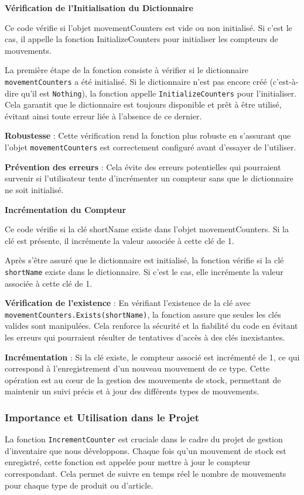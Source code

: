 \documentclass[a4paper, oneside, 12pt, final]{extreport}
\begin{document}
\textbf{Vérification de l'Initialisation du Dictionnaire}

Ce code vérifie si l'objet movementCounters est vide ou non initialisé. Si c'est le cas, il appelle la fonction InitializeCounters pour initialiser les compteurs de mouvements.

La première étape de la fonction consiste à vérifier si le dictionnaire \texttt{movementCounters} a été initialisé. Si le dictionnaire n'est pas encore créé (c'est-à-dire qu'il est \texttt{Nothing}), la fonction appelle \texttt{InitializeCounters} pour l'initialiser. Cela garantit que le dictionnaire est toujours disponible et prêt à être utilisé, évitant ainsi toute erreur liée à l'absence de ce dernier.

\textbf{Robustesse} : Cette vérification rend la fonction plus robuste en s'assurant que l'objet \texttt{movementCounters} est correctement configuré avant d'essayer de l'utiliser.

\textbf{Prévention des erreurs} : Cela évite des erreurs potentielles qui pourraient survenir si l'utilisateur tente d'incrémenter un compteur sans que le dictionnaire ne soit initialisé.



\textbf{Incrémentation du Compteur}


Ce code vérifie si la clé shortName existe dans l'objet movementCounters. Si la clé est présente, il incrémente la valeur associée à cette clé de 1.

Après s'être assuré que le dictionnaire est initialisé, la fonction vérifie si la clé \texttt{shortName} existe dans le dictionnaire. Si c'est le cas, elle incrémente la valeur associée à cette clé de 1.

\textbf{Vérification de l'existence} : En vérifiant l'existence de la clé avec \texttt{movementCounters.Exists(shortName)}, la fonction assure que seules les clés valides sont manipulées. Cela renforce la sécurité et la fiabilité du code en évitant les erreurs qui pourraient résulter de tentatives d'accès à des clés inexistantes.

\textbf{Incrémentation} : Si la clé existe, le compteur associé est incrémenté de 1, ce qui correspond à l'enregistrement d'un nouveau mouvement de ce type. Cette opération est au cœur de la gestion des mouvements de stock, permettant de maintenir un suivi précis et à jour des différents types de mouvements.

\subsubsection{Importance et Utilisation dans le Projet}
La fonction \texttt{IncrementCounter} est cruciale dans le cadre du projet de gestion d'inventaire que nous développons. Chaque fois qu'un mouvement de stock est enregistré, cette fonction est appelée pour mettre à jour le compteur correspondant. Cela permet de suivre en temps réel le nombre de mouvements pour chaque type de produit ou d'article.
\end{document}
